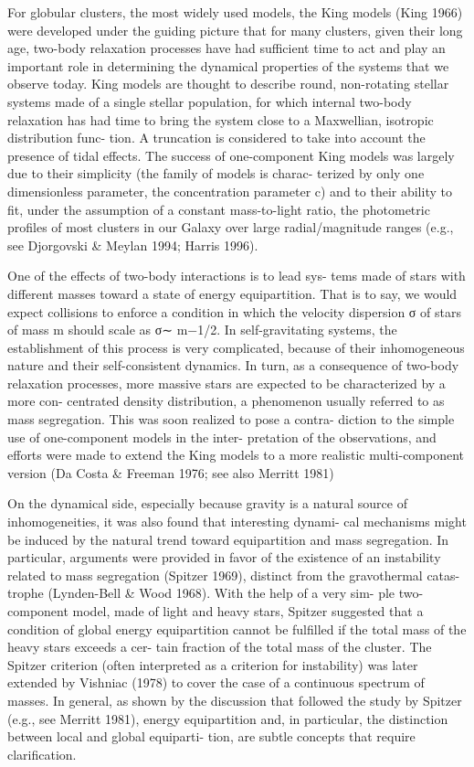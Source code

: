 \documentclass[../Main.tex]{subfiles}
\begin{document}
{For globular clusters, the most widely used models, the King
models (King 1966) were developed under the guiding picture
that for many clusters, given their long age, two-body relaxation
processes have had suﬃcient time to act and play an important
role in determining the dynamical properties of the systems that
we observe today. King models are thought to describe round,
non-rotating stellar systems made of a single stellar population,
for which internal two-body relaxation has had time to bring
the system close to a Maxwellian, isotropic distribution func-
tion. A truncation is considered to take into account the presence
of tidal eﬀects. The success of one-component King models was
largely due to their simplicity (the family of models is charac-
terized by only one dimensionless parameter, the concentration
parameter c) and to their ability to fit, under the assumption of
a constant mass-to-light ratio, the photometric profiles of most
clusters in our Galaxy over large radial/magnitude ranges (e.g.,
see Djorgovski & Meylan 1994; Harris 1996).

One of the eﬀects of two-body interactions is to lead sys-
tems made of stars with diﬀerent masses toward a state of energy
equipartition. That is to say, we would expect collisions to enforce
a condition in which the velocity dispersion σ of stars of mass
m should scale as σ∼ m−1/2. In self-gravitating systems, the
establishment of this process is very complicated, because of
their inhomogeneous nature and their self-consistent dynamics.
In turn, as a consequence of two-body relaxation processes, more
massive stars are expected to be characterized by a more con-
centrated density distribution, a phenomenon usually referred to
as mass segregation. This was soon realized to pose a contra-
diction to the simple use of one-component models in the inter-
pretation of the observations, and eﬀorts were made to extend
the King models to a more realistic multi-component version
(Da Costa & Freeman 1976; see also Merritt 1981)

On the
dynamical side, especially because gravity is a natural source of
inhomogeneities, it was also found that interesting dynami-
cal mechanisms might be induced by the natural trend toward
equipartition and mass segregation. In particular, arguments were
provided in favor of the existence of an instability related to mass
segregation (Spitzer 1969), distinct from the gravothermal catas-
trophe (Lynden-Bell & Wood 1968). With the help of a very sim-
ple two-component model, made of light and heavy stars, Spitzer
suggested that a condition of global energy equipartition cannot
be fulfilled if the total mass of the heavy stars exceeds a cer-
tain fraction of the total mass of the cluster. The Spitzer criterion
(often interpreted as a criterion for instability) was later extended
by Vishniac (1978) to cover the case of a continuous spectrum of
masses. In general, as shown by the discussion that followed the
study by Spitzer (e.g., see Merritt 1981), energy equipartition and,
in particular, the distinction between local and global equiparti-
tion, are subtle concepts that require clarification.

}
\end{document}
